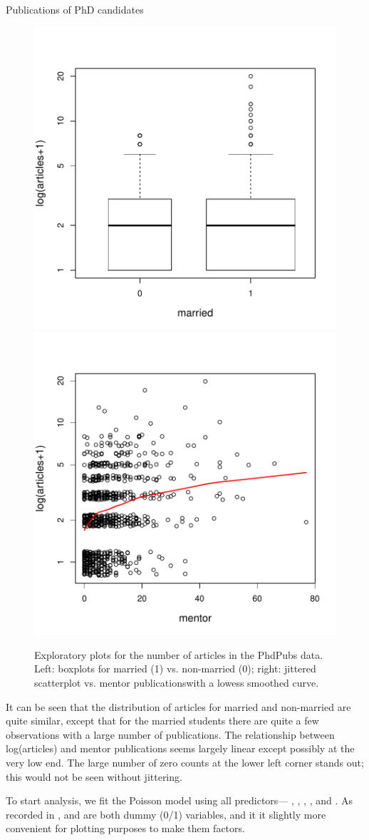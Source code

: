 \documentclass[11pt]{book}\usepackage[]{graphicx}\usepackage[]{color}
\newenvironment{knitrout}{}{} %
\renewenvironment{knitrout}{\small\renewcommand{\baselinestretch}{.85}}{} %
\begin{document}
\begin{Example}[phdpubs1]{Publications of PhD candidates}
\begin{knitrout}
\begin{figure}[!htbp]
\centerline{\includegraphics[width=.49\textwidth]{ch09/fig/phdpubs-logplots1} 
\includegraphics[width=.49\textwidth]{ch09/fig/phdpubs-logplots2} }

\caption[Exploratory plots for the number of articles in the PhdPubs data]{Exploratory plots for the number of articles in the PhdPubs data. Left: boxplots for married (1) vs. non-married (0); right: jittered scatterplot vs. mentor publicationswith a lowess smoothed curve.\label{fig:phdpubs-logplots}}
\end{figure}


\end{knitrout}
It can be seen that the distribution of articles for married and non-married are quite similar,
except that for the married students there are quite a few observations with a large number
of publications.  The relationship between log(articles) and mentor publications seems largely
linear except possibly at the very low end.  The large number of zero counts at the lower left
corner stands out; this would not be seen without jittering.

To start analysis, we fit the Poisson model using all predictors---
, , , , and
. As recorded in ,  and
 are both dummy (0/1) variables, and it it slightly
more convenient for plotting purposes to make them factors.


\end{Example}
\end{document}
